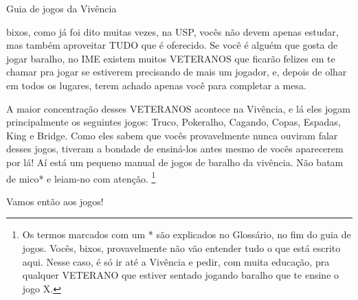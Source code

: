 \begin{secao}{Guia de jogos da Vivência }

bixos, como já foi dito muitas vezes, na USP, vocês não devem apenas estudar, mas
também aproveitar TUDO que é oferecido. Se você é alguém que gosta de jogar
baralho, no IME existem muitos VETERANOS que ficarão felizes em te chamar pra
jogar se estiverem precisando de mais um jogador, e, depois de olhar em todos
os lugares, terem achado apenas você para completar a mesa. 

A maior concentração desses VETERANOS acontece na Vivência, e lá eles jogam
principalmente os seguintes jogos: Truco, Pokeralho, Cagando, Copas, Espadas,
King e Bridge. Como eles sabem que vocês provavelmente nunca ouviram falar desses jogos,
tiveram a bondade de ensiná-los antes mesmo de vocês aparecerem por lá! Aí está um
pequeno manual de jogos de baralho da vivência. Não batam de mico* e
leiam-no com atenção. \footnote{Os termos marcados com um * são explicados no Glossário, no fim do guia de
jogos. Vocês, bixos, provavelmente não vão entender tudo o que está escrito aqui.
Nesse caso, é só ir até a Vivência e pedir, com muita educação, pra qualquer 
VETERANO que estiver sentado jogando baralho que te ensine o jogo X.}

Vamos então aos jogos!










\end{secao}
